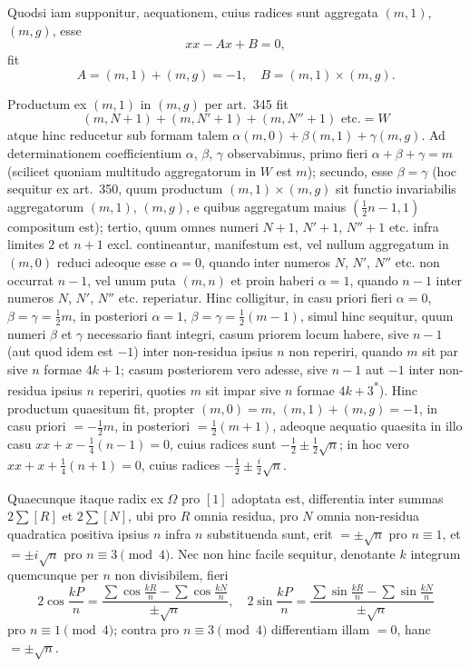 \documentclass[12pt,a4paper]{article}
\theoremstyle{plain}
\theoremstyle{definition}
\theoremstyle{remark}
\begin{document}
Quodsi iam supponitur, aequationem, cuius radices sunt aggregata
$(m,1)$, $(m,g)$, esse
\[
xx - Ax + B = 0,
\]
fit
\[
A = (m,1) + (m,g) = -1, \quad B = (m,1) \times (m,g).
\]

Productum ex $(m,1)$ in $(m,g)$ per art.~345 fit
\[
(m,N+1) + (m,N'+1) + (m,N''+1) \text{ etc.} = W
\]
atque hinc reducetur sub formam talem $\alpha(m,0) + \beta(m,1) + \gamma(m,g)$.
Ad determinationem coefficientium $\alpha$, $\beta$, $\gamma$ observabimus, primo
fieri $\alpha + \beta + \gamma = m$ (scilicet quoniam multitudo aggregatorum in
$W$ est $m$); secundo, esse $\beta = \gamma$ (hoc sequitur ex art.~350, quum
productum $(m,1) \times (m,g)$ sit functio invariabilis aggregatorum
$(m,1)$, $(m,g)$, e quibus aggregatum maius $(\frac{1}{2}n-1, 1)$ compositum
est); tertio, quum omnes numeri $N+1$, $N'+1$, $N''+1$ etc. infra limites
$2$ et $n+1$ excl. contineantur, manifestum est, vel nullum aggregatum in
$(m,0)$ reduci adeoque esse $\alpha = 0$, quando inter numeros $N$, $N'$,
$N''$ etc. non occurrat $n-1$, vel unum puta $(m,n)$ et proin haberi
$\alpha = 1$, quando $n-1$ inter numeros $N$, $N'$, $N''$ etc. reperiatur.
Hinc colligitur, in casu priori fieri $\alpha = 0$, $\beta = \gamma = \frac{1}{2}m$,
in posteriori $\alpha = 1$, $\beta = \gamma = \frac{1}{2}(m-1)$, simul hinc sequitur,
quum numeri $\beta$ et $\gamma$ necessario fiant integri, casum priorem locum
habere, sive $n-1$ (aut quod idem est $-1$) inter non-residua ipsius $n$
non reperiri, quando $m$ sit par sive $n$ formae $4k+1$; casum posteriorem
vero adesse, sive $n-1$ aut $-1$ inter non-residua ipsius $n$ reperiri,
quoties $m$ sit impar sive $n$ formae $4k+3$\textsuperscript{*}). Hinc productum
quaesitum fit, propter $(m,0) = m$, $(m,1) + (m,g) = -1$, in casu priori
$= -\frac{1}{2}m$, in posteriori $= \frac{1}{2}(m+1)$, adeoque aequatio quaesita in
illo casu $xx + x - \frac{1}{4}(n-1) = 0$, cuius radices sunt
$-\frac{1}{2} \pm \frac{1}{2}\sqrt{n}$; in hoc vero $xx + x + \frac{1}{4}(n+1) = 0$,
cuius radices $-\frac{1}{2} \pm \frac{i}{2}\sqrt{n}$.

Quaecunque itaque radix ex $\Omega$ pro $[1]$ adoptata est, differentia inter
summas $2\sum [R]$ et $2\sum [N]$, ubi pro $R$ omnia residua, pro $N$ omnia
non-residua quadratica positiva ipsius $n$ infra $n$ substituenda sunt, erit
$= \pm\sqrt{n}$ pro $n \equiv 1$, et $= \pm i\sqrt{n}$ pro $n \equiv 3 \pmod{4}$.
Nec non hinc facile sequitur, denotante $k$ integrum quemcunque per $n$ non
divisibilem, fieri
\[
2\cos\frac{kP}{n} = \frac{\sum\cos\frac{kR}{n} - \sum\cos\frac{kN}{n}}{\pm\sqrt{n}},
\quad
2\sin\frac{kP}{n} = \frac{\sum\sin\frac{kR}{n} - \sum\sin\frac{kN}{n}}{\pm\sqrt{n}}
\]
pro $n \equiv 1 \pmod{4}$; contra pro $n \equiv 3 \pmod{4}$ differentiam illam
$= 0$, hanc $= \pm\sqrt{n}$.
\end{document}
